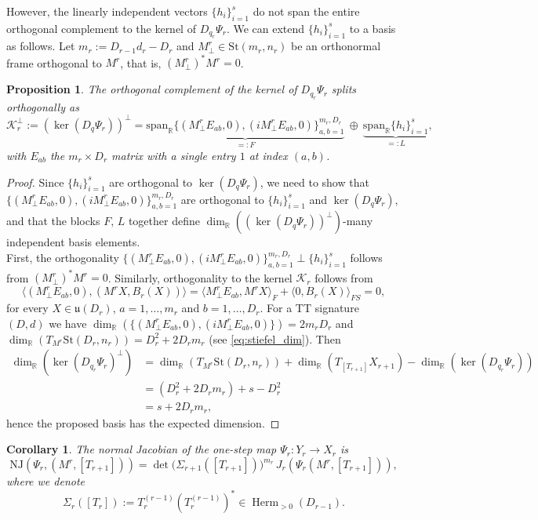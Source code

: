 \documentclass{article}
\newtheorem{corollary}[theorem]{Corollary}
\newtheorem{proposition}[theorem]{Proposition}
\theoremstyle{definition}
\DeclareMathOperator{\Herm}{Herm}
\newcommand{\R}{\mathbb{R}}
\newcommand{\St}{\mathrm{St}}
\newcommand{\NJ}{\mathrm{NJ}}
\begin{document}
\noindent
However, the linearly independent vectors $\{h_i\}_{i=1}^{s}$ do not span the entire orthogonal complement to the kernel of $D_{{q_r}}\Psi_r$. We can extend $\{h_i\}_{i=1}^{s}$ to a basis as follows. Let $m_r := D_{r-1}d_r - D_r$ and $M^r_{\perp}\in \St(m_r,n_r)$ be an orthonormal frame orthogonal to $M^r$, that is, $(M^r_{\perp})^*M^r=0$.
\begin{proposition}\label{prop:basis_complement}
The orthogonal complement of the kernel of $D_{q_r}\Psi_r$ splits orthogonally as
\begin{equation}\label{eq:K_decomposition}
   \mathcal K_r^{\perp} := (\ker(D_q\Psi_r))^{\perp}
=
\underbrace{
\mathrm{span}_\R\{(M_\perp^rE_{ab},0),(iM_\perp^rE_{ab},0)\}_{a,b=1}^{m_r,D_r}
}_{=:F}
\ \oplus\
\underbrace{\mathrm{span}_{\mathbb R}\{h_i\}_{i=1}^{s}}_{=:L},
\end{equation}
with $E_{ab}$ the $m_r \times D_r$ matrix with a single entry $1$ at index $(a,b)$. 
\end{proposition}
\begin{proof}
Since \(\{h_i\}_{i=1}^s\) are orthogonal to $\ker(D_q\Psi_r)$, we need to show that~$\{(M_\perp^rE_{ab},0),(iM_\perp^rE_{ab},0)\}_{a,b=1}^{m_r,D_r}$ are orthogonal to \(\{h_i\}_{i=1}^s\) and $\ker(D_q\Psi_r)$, and that the blocks $F,\,L$ together define $\dim_{\R}((\ker(D_q\Psi_r))^{\perp})$-many independent basis elements.
\\
First, the orthogonality $\{(M_\perp^rE_{ab},0),(iM_\perp^rE_{ab},0)\}_{a,b=1}^{m_r,D_r} \perp \{h_i\}_{i=1}^s$ follows from $(M^r_{\perp})^*M^r =0$. Similarly, orthogonality to the kernel $\mathcal K_r$ follows from
\begin{equation*}
    \langle (M_\perp^rE_{ab},0), (M^rX, B_r(X))\rangle = \langle M_\perp^rE_{ab}, M^rX\rangle_{F} + \langle 0, B_r(X) \rangle_{FS}=0,
\end{equation*}
for every $X \in \mathfrak u(D_r)$, $a=1,\dots,m_r$ and $b=1,\dots,D_r$.
For a TT signature $(D,d)$ we have $\dim_{\R}(\{(M_\perp^rE_{ab},0),(iM_\perp^rE_{ab},0)\})= 2m_rD_r$ and $\dim_{\R}(T_{M^r}\St(D_r,n_r)) = D_r^2 + 2D_rm_r$ (see \eqref{eq:stiefel_dim}). Then
\begin{align*}
    \dim_{\R}(\ker(D_{q_r}\Psi_r)^{\perp})&= \dim_{\R}(T_{M^r}\St(D_r,n_r)) + \dim_{\R}(T_{[T_{r+1}]}X_{r+1}) - \dim_{\R}(\ker(D_{q_r}\Psi_r)) \\
    &= (D_r^2 + 2D_rm_r) +s -D_r^2  \\
    &= s + 2D_rm_r,
\end{align*}
hence the proposed basis has the expected dimension. 
\end{proof}
\begin{corollary}\label{cor:NJ_Psi_r}
The normal Jacobian of the one-step map \(\Psi_r: Y_r \longrightarrow X_r\) is
\[
\NJ(\Psi_r,(M^r, [T_{r+1}]))
=
\det\bigl(\Sigma_{r+1}([T_{r+1}])\bigr)^{m_r}
\,J_r(\Psi_r(M^r, [T_{r+1}])),
\]
where we denote
\begin{equation}\label{eq:Sigma_r_definition}
\Sigma_r([T_r])
:=
T_r^{(r-1)}
(T_r^{(r-1)})^* \in \Herm_{>0}(D_{r-1}).
\end{equation}
\end{corollary}
\end{document}

